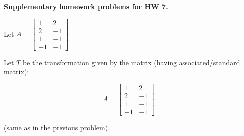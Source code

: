 \documentclass[10pt]{exam}
\begin{document}
{\bf Supplementary homework problems for HW 7.}

\begin{questions}


\question Let $A=\left[ \begin{array}{rr} 1&2\\2&-1\\1&-1\\-1&-1  \end{array} \right] $



\question Let $T$ be the transformation given by the matrix (having associated/standard matrix):

\[ A=\left[ \begin{array}{rr} 1&2\\2&-1\\1&-1\\-1&-1  \end{array} \right] \]

(same as in the previous problem).

\end{questions}
\end{document}
